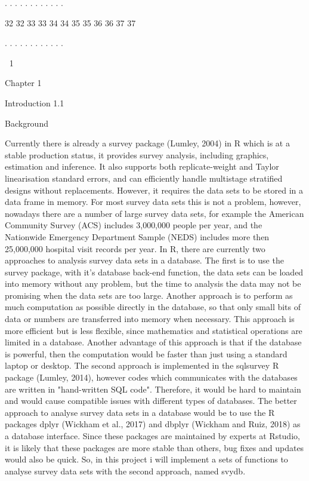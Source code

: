 .
.
.
.
.
.
.
.
.
.
.
.

32
32
33
33
34
34
35
35
36
36
37
37

.
.
.
.
.
.
.
.
.
.
.
.

1

Chapter 1

Introduction
1.1

Background

Currently there is already a survey package (Lumley, 2004) in R which is at a stable production status, it provides survey analysis, including graphics, estimation
and inference. It also supports both replicate-weight and Taylor linearisation standard errors, and can efficiently handle multistage stratified designs without replacements. However, it requires the data sets to be stored in a data frame in memory. For
most survey data sets this is not a problem, however, nowadays there are a number
of large survey data sets, for example the American Community Survey (ACS) includes 3,000,000 people per year, and the Nationwide Emergency Department Sample (NEDS) includes more then 25,000,000 hospital visit records per year.
In R, there are currently two approaches to analysis survey data sets in a database.
The first is to use the survey package, with it’s database back-end function, the data
sets can be loaded into memory without any problem, but the time to analysis the
data may not be promising when the data sets are too large.
Another approach is to perform as much computation as possible directly in the
database, so that only small bits of data or numbers are transferred into memory
when necessary. This approach is more efficient but is less flexible, since mathematics and statistical operations are limited in a database. Another advantage of this
approach is that if the database is powerful, then the computation would be faster
than just using a standard laptop or desktop.
The second approach is implemented in the sqlsurvey R package (Lumley, 2014),
however codes which communicates with the databases are written in "hand-written
SQL code". Therefore, it would be hard to maintain and would cause compatible issues with different types of databases.
The better approach to analyse survey data sets in a database would be to use the
R packages dplyr (Wickham et al., 2017) and dbplyr (Wickham and Ruiz, 2018) as a
database interface. Since these packages are maintained by experts at Rstudio, it is
likely that these packages are more stable than others, bug fixes and updates would
also be quick. So, in this project i will implement a sets of functions to analyse survey
data sets with the second approach, named svydb.

